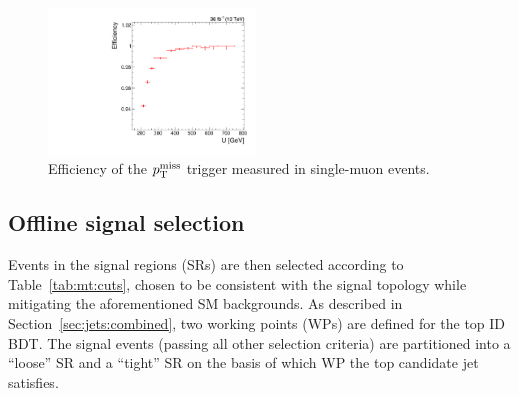\begin{figure}[]
    \begin{center}
        \includegraphics[width=0.49\textwidth]{figures/monotop/trigger/trigeff_nmu1pfUWmag.pdf}
        \caption{Efficiency of the $p_\mathrm{T}^\mathrm{miss}$ trigger measured in single-muon events. }
        \label{fig:mt:trigeff}
    \end{center}
\end{figure}

\subsection{Offline signal selection}

Events in the signal regions (SRs) are then selected according to Table~\ref{tab:mt:cuts}, chosen to be consistent with the signal topology while mitigating the aforementioned SM backgrounds.
As described in Section~\ref{sec:jets:combined}, two working points (WPs) are defined for the top ID BDT.
The signal events (passing all other selection criteria) are partitioned into a ``loose'' SR and a ``tight'' SR on the basis of which WP the top candidate jet satisfies.

